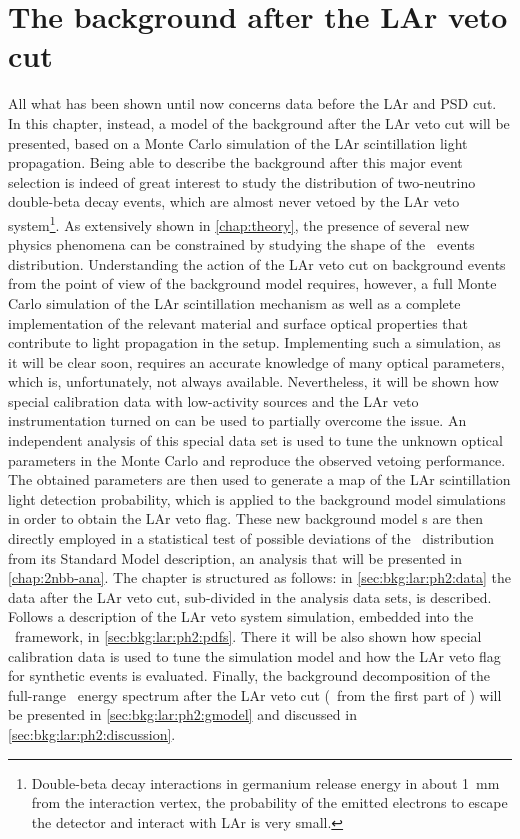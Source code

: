 
\chapter{The background after the LAr veto cut}%
\label{chap:bkg:lar:ph2}

All what has been shown until now concerns data before the LAr and PSD cut. In this
chapter, instead, a model of the background after the LAr veto cut will be presented,
based on a Monte Carlo simulation of the LAr scintillation light propagation. Being able
to describe the background after this major event selection is indeed of great interest to
study the distribution of two-neutrino double-beta decay events, which are almost never
vetoed by the LAr veto system\footnote{%
  Double-beta decay interactions in germanium release energy in about 1~mm from the
  interaction vertex, the probability of the emitted electrons to escape the detector and
  interact with LAr is very small.
}. As extensively shown in \cref{chap:theory}, the presence of several new physics
phenomena can be constrained by studying the shape of the \nnbb\ events distribution.
Understanding the action of the LAr veto cut on background events from the point of view
of the background model requires, however, a full Monte Carlo simulation of the LAr
scintillation mechanism as well as a complete implementation of the relevant material and
surface optical properties that contribute to light propagation in the setup.
Implementing such a simulation, as it will be clear soon, requires an accurate knowledge
of many optical parameters, which is, unfortunately, not always available.
Nevertheless, it will be shown how special calibration data with low-activity sources and
the LAr veto instrumentation turned on can be used to partially overcome the issue. An
independent analysis of this special data set is used to tune the unknown optical
parameters in the Monte Carlo and reproduce the observed vetoing performance.  The
obtained parameters are then used to generate a map of the LAr scintillation light
detection probability, which is applied to the background model simulations in order to
obtain the LAr veto flag. These new background model \pdf{}s are then directly employed in a
statistical test of possible deviations of the \nnbb\ distribution from its Standard Model
description, an analysis that will be presented in \cref{chap:2nbb-ana}.
\newpar
The chapter is structured as follows: in \cref{sec:bkg:lar:ph2:data} the data after the
LAr veto cut, sub-divided in the analysis data sets, is described. Follows a description
of the LAr veto system simulation, embedded into the \mage\ framework, in
\cref{sec:bkg:lar:ph2:pdfs}. There it will be also shown how special calibration data is
used to tune the simulation model and how the LAr veto flag for synthetic events is
evaluated. Finally, the background decomposition of the full-range \gerda\ energy spectrum
after the LAr veto cut (\gexpophasetwobkg\ from the first part of \phasetwo) will be
presented in \cref{sec:bkg:lar:ph2:gmodel} and discussed in
\cref{sec:bkg:lar:ph2:discussion}.

